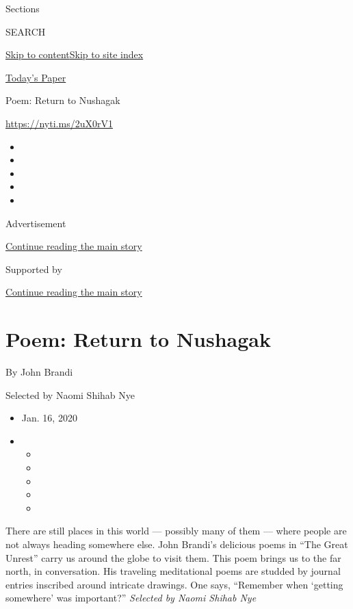 Sections

SEARCH

\protect\hyperlink{site-content}{Skip to
content}\protect\hyperlink{site-index}{Skip to site index}

\href{https://myaccount.nytimes3xbfgragh.onion/auth/login?response_type=cookie\&client_id=vi}{}

\href{https://www.nytimes3xbfgragh.onion/section/todayspaper}{Today's
Paper}

Poem: Return to Nushagak

\url{https://nyti.ms/2uX0rV1}

\begin{itemize}
\item
\item
\item
\item
\item
\end{itemize}

Advertisement

\protect\hyperlink{after-top}{Continue reading the main story}

Supported by

\protect\hyperlink{after-sponsor}{Continue reading the main story}

\hypertarget{poem-return-to-nushagak}{%
\section{Poem: Return to Nushagak}\label{poem-return-to-nushagak}}

By John Brandi

Selected by Naomi Shihab Nye

\begin{itemize}
\item
  Jan. 16, 2020
\item
  \begin{itemize}
  \item
  \item
  \item
  \item
  \item
  \end{itemize}
\end{itemize}

There are still places in this world --- possibly many of them --- where
people are not always heading somewhere else. John Brandi's delicious
poems in ``The Great Unrest'' carry us around the globe to visit them.
This poem brings us to the far north, in conversation. His traveling
meditational poems are studded by journal entries inscribed around
intricate drawings. One says, ``Remember when `getting somewhere' was
important?'' \emph{Selected by Naomi Shihab Nye}

